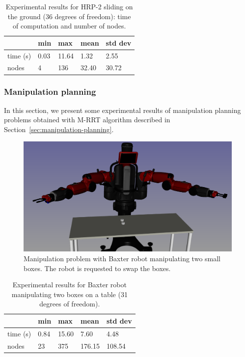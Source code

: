 \begin{table}
  \begin{center}
  \begin{tabular}{|l|l|l|l|l|}
    \hline
    & min & max & mean & std dev \\
    \hline
    time (s) & 0.03 & 11.64 & 1.32 & 2.55 \\
    nodes & 4 &  136 & 32.40 & 30.72\\
    \hline
  \end{tabular}
  \end{center}
  \caption{Experimental results for HRP-2 sliding on the ground {\color{blue}(36 degrees of freedom)}: time of computation and number of nodes.}
  \label{tab:benchmark-hrp2}
\end{table}

\subsubsection{Manipulation planning}

In this section, we present some experimental results of manipulation planning
problems obtained with M-RRT algorithm described in Section~\ref{sec:manipulation-planning}.

\begin{figure}
  \begin{center}
    \includegraphics[width=\linewidth]{figures/baxter-manipulation-boxes}
  \end{center}
  \caption{Manipulation problem with Baxter robot manipulating two small boxes. The robot is requested to swap the boxes.}
  \label{fig:baxter-manipulation-boxes}
\end{figure}

\begin{table}
  \begin{center}
  \begin{tabular}{|l|l|l|l|l|}
    \hline
    & min & max & mean & std dev \\
    \hline
    time (s) & 0.84 & 15.60 & 7.60 & 4.48 \\
    nodes & 23 &  375 & 176.15 & 108.54 \\
    \hline
  \end{tabular}
  \end{center}
  \caption{Experimental results for Baxter robot manipulating two boxes on a table {\color{blue}(31 degrees of freedom)}.}
  \label{tab:baxter-manipulation-boxes}
\end{table}

